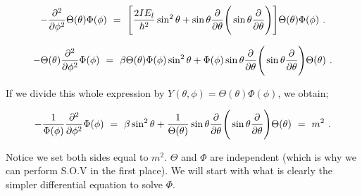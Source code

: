 \documentclass{article}
\begin{document}
\begin{equation} \label{eb-eq-256-51}
-\frac{\partial^{2}}{\partial{\phi^{2}}} \Theta(\theta) \Phi(\phi) \hspace{0.125cm} = \hspace{0.125cm} \Bigg[ \frac{2 I E_l}{\hbar^{2}} \sin^{2} \theta + \sin\theta\frac{\partial}{\partial{\theta}}\Bigg(\sin\theta \frac{\partial}{\partial{\theta}}\Bigg) \Bigg] \Theta(\theta) \Phi(\phi) \hspace{0.125cm}. 
\end{equation}

\begin{equation} \label{eb-eq-256-52}
- \Theta(\theta) \frac{\partial^{2}}{\partial{\phi^{2}}} \Phi(\phi) \hspace{0.125cm} = \hspace{0.125cm} \beta \Theta(\theta) \Phi(\phi) \sin^{2} \theta + \Phi(\phi) \sin\theta \frac{\partial}{\partial{\theta}}\Bigg(\sin\theta \frac{\partial}{\partial{\theta}}\Bigg) \Theta(\theta)  \hspace{0.125cm}. 
\end{equation}

If we divide this whole expression by \begin{math} Y(\theta,\phi) = \Theta(\theta) \Phi(\phi) \end{math}, we obtain;

\begin{equation} \label{eb-eq-256-53}
- \frac{1}{\Phi(\phi)} \frac{\partial^{2}}{\partial{\phi^{2}}} \Phi(\phi) \hspace{0.125cm} = \hspace{0.125cm} \beta \sin^{2}\theta + \frac{1}{\Theta(\theta)} \sin\theta \frac{\partial}{\partial{\theta}}\Bigg(\sin\theta \frac{\partial}{\partial{\theta}}\Bigg) \Theta(\theta) \hspace{0.125cm} = \hspace{0.125cm} m^2 \hspace{0.125cm}. 
\end{equation}

Notice we set both sides equal to \begin{math} m^2 \end{math}.  \begin{math} \Theta \end{math} and \begin{math} \Phi \end{math} are independent (which is why we can perform S.O.V in the first place). We will start with what is clearly the simpler differential equation to solve \begin{math} \Phi \end{math}. 
\end{document}
